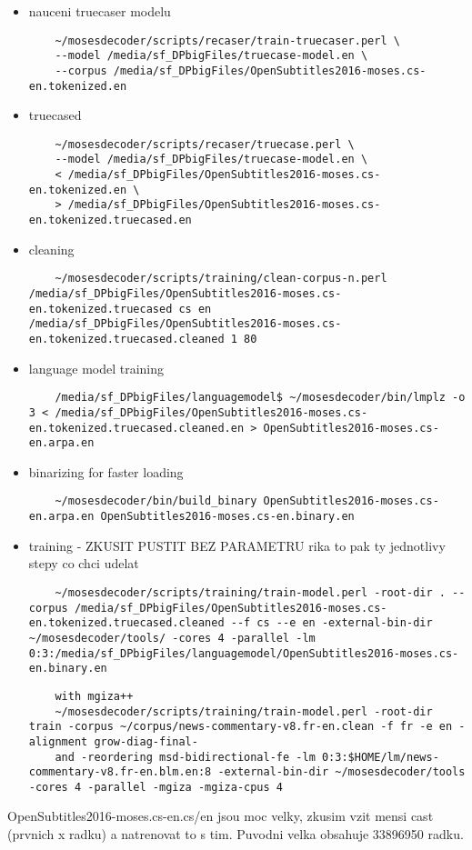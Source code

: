 \begin{itemize}
\begin{itemize}
\begin{lstlisting}
    \end{lstlisting}
    \item nauceni truecaser modelu
    \begin{lstlisting}
    ~/mosesdecoder/scripts/recaser/train-truecaser.perl \
    --model /media/sf_DPbigFiles/truecase-model.en \
    --corpus /media/sf_DPbigFiles/OpenSubtitles2016-moses.cs-en.tokenized.en
    \end{lstlisting}
    \item truecased
    \begin{lstlisting}
    ~/mosesdecoder/scripts/recaser/truecase.perl \
    --model /media/sf_DPbigFiles/truecase-model.en \
    < /media/sf_DPbigFiles/OpenSubtitles2016-moses.cs-en.tokenized.en \
    > /media/sf_DPbigFiles/OpenSubtitles2016-moses.cs-en.tokenized.truecased.en
    \end{lstlisting}
    \item cleaning
    \begin{lstlisting}
    ~/mosesdecoder/scripts/training/clean-corpus-n.perl /media/sf_DPbigFiles/OpenSubtitles2016-moses.cs-en.tokenized.truecased cs en /media/sf_DPbigFiles/OpenSubtitles2016-moses.cs-en.tokenized.truecased.cleaned 1 80
    \end{lstlisting}
    \item language model training
    \begin{lstlisting}
    /media/sf_DPbigFiles/languagemodel$ ~/mosesdecoder/bin/lmplz -o 3 < /media/sf_DPbigFiles/OpenSubtitles2016-moses.cs-en.tokenized.truecased.cleaned.en > OpenSubtitles2016-moses.cs-en.arpa.en
    \end{lstlisting}
    \item binarizing for faster loading
    \begin{lstlisting}
    ~/mosesdecoder/bin/build_binary OpenSubtitles2016-moses.cs-en.arpa.en OpenSubtitles2016-moses.cs-en.binary.en
    \end{lstlisting}
    \item training - ZKUSIT PUSTIT BEZ PARAMETRU rika to pak ty jednotlivy stepy co chci udelat
    \begin{lstlisting}
    ~/mosesdecoder/scripts/training/train-model.perl -root-dir . --corpus /media/sf_DPbigFiles/OpenSubtitles2016-moses.cs-en.tokenized.truecased.cleaned --f cs --e en -external-bin-dir ~/mosesdecoder/tools/ -cores 4 -parallel -lm 0:3:/media/sf_DPbigFiles/languagemodel/OpenSubtitles2016-moses.cs-en.binary.en
    \end{lstlisting}
    \begin{lstlisting}
    with mgiza++
    ~/mosesdecoder/scripts/training/train-model.perl -root-dir train -corpus ~/corpus/news-commentary-v8.fr-en.clean -f fr -e en -alignment grow-diag-final-
    and -reordering msd-bidirectional-fe -lm 0:3:$HOME/lm/news-commentary-v8.fr-en.blm.en:8 -external-bin-dir ~/mosesdecoder/tools -cores 4 -parallel -mgiza -mgiza-cpus 4
    \end{lstlisting}
  \end{itemize}
  OpenSubtitles2016-moses.cs-en.cs/en jsou moc velky, zkusim vzit mensi cast (prvnich x radku) a natrenovat to s tim. Puvodni velka obsahuje 33896950 radku.


\end{itemize}
